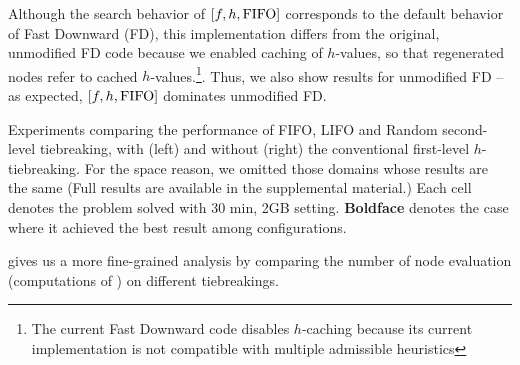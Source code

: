 Although the search behavior of $[f,h,\mbox{FIFO}]$ corresponds to the default behavior of Fast Downward (FD), this implementation differs 
from the original, unmodified FD code because we enabled caching of $h$-values, so that regenerated nodes refer to cached $h$-values.\footnote{The current Fast Downward code disables $h$-caching because its current implementation is not compatible with multiple admissible heuristics}.
Thus, we also show results for unmodified FD -- as expected, $[f,h,\mbox{FIFO}]$ dominates unmodified FD.


\begin{table}[htb]
 \centering {}
 
 \caption{Experiments comparing the performance of FIFO, LIFO and Random
 second-level tiebreaking, with (left) and without (right) the
 conventional first-level $h$-tiebreaking.  For the space reason, we
 omitted those domains whose results are the same (Full results are
 available in the supplemental material.) Each cell denotes the problem
 solved with 30 min, 2GB setting. \textbf{Boldface} denotes the case
 where it achieved the best result among configurations.}
 \label{single-coverage}
\end{table}

 gives us a more fine-grained analysis by comparing the
number of node evaluation (computations of \lmcut) on
different tiebreakings.

